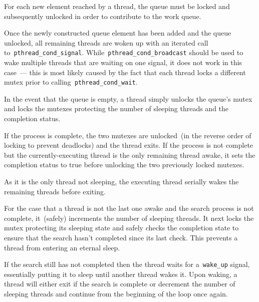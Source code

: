 \documentclass{article}
\newcommand{\clst}[2]{
	\begin{center}
	\parbox{.6\textwidth}{
	}
	\end{center}
}
\newcommand{\ttt}[1]{\texttt{#1}}
\begin{document}
For each new element reached by a thread, the queue must be locked and
subsequently unlocked in order to contribute to the work queue.
%
\clst{370}{383}
%
Once the newly constructed queue element has been added and the queue unlocked,
all remaining threads are woken up with an iterated call
to~\ttt{pthread\_cond\_signal}.  While~\ttt{pthread\_cond\_broadcast} should be
used to wake multiple threads that are waiting on one signal, it does not work
in this case~--- this is most likely caused by the fact that each thread locks
a different mutex prior to calling~\ttt{pthread\_cond\_wait}.

In the event that the queue is empty, a thread simply unlocks the queue's mutex
and locks the mutexes protecting the number of sleeping threads and the
completion status.
%
\clst{434}{445}
%
If the process is complete, the two mutexes are unlocked~(in the reverse order
of locking to prevent deadlocks) and the thread exits.  If the process is not
complete but the currently-executing thread is the only remaining thread awake,
it sets the completion status to true before unlocking the two previously
locked mutexes.
%
\clst{446}{457}
%
As it is the only thread not sleeping, the executing thread serially wakes the
remaining threads before exiting.

For the case that a thread is not the last one awake and the search process is
not complete, it~(safely) increments the number of sleeping threads.  It next
locks the mutex protecting its sleeping state and safely checks the completion
state to ensure that the search hasn't completed since its last check.  This
prevents a thread from entering an eternal sleep.
%
\clst{458}{486}
%
If the search still has not completed then the thread waits for
a~\ttt{wake\_up} signal, essentially putting it to sleep until another thread
wakes it.  Upon waking, a thread will either exit if the search is complete or
decrement the number of sleeping threads and continue from the beginning of the
loop once again.
\end{document}
